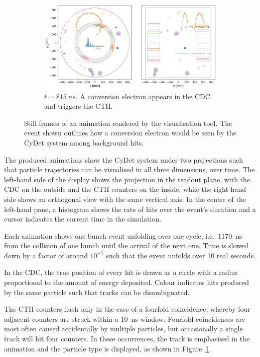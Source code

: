 \begin{figure}
    \begin{subfigure}[t]{0.59\textwidth}
    \centering
    \includegraphics[width=\textwidth]{chapter3/frame_192.png}
    \caption{$t=\SI{815}{ns}$. A conversion electron appears in the CDC and
    triggers the CTH.}
    \label{fig:animation:conv}
    \end{subfigure}
    
    \caption{ Still frames of an animation rendered by the visualisation tool.
        The event shown outlines how a conversion electron would be seen by the
        CyDet system among background hits.}
    \label{fig:animation}
\end{figure}


The produced animations show the CyDet system under two projections such that
particle trajectories can be visualised in all three dimensions, over time. The
left-hand side of the display shows the projection in the readout plane, with
the CDC on the outside and the CTH counters on the inside, while the right-hand
side shows an orthogonal view with the same vertical axis. In the centre of the
left-hand pane, a histogram shows the rate of hits over the event's duration and
a cursor indicates the current time in the simulation.

Each animation shows one bunch event unfolding over one cycle, i.e.\
\SI{1170}{\ns} from the collision of one bunch until the arrival of the next
one. Time is slowed down by a factor of around $10^{-7}$ such that the event
unfolds over 10 real seconds.

In the CDC, the true position of every hit is drawn as a circle with a radius
proportional to the amount of energy deposited. Colour indicates hits produced
by the same particle such that tracks can be disambiguated.

The CTH counters flash only in the case of a fourfold coincidence, whereby four
adjacent counters are struck within a \SI{10}{\ns} window. Fourfold coincidences
are most often caused accidentally by multiple particles, but occasionally a
single track will hit four counters. In these occurrences, the track is
emphasised in the animation and the particle type is displayed, as shown
in Figure~\ref{fig:animation:conv}.

